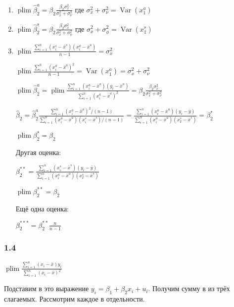 \documentclass[10pt, a4paper]{extarticle}
\def \hb{\hat{\beta}}
\DeclareMathOperator{\plim}{plim}
\DeclareMathOperator{\Var}{Var}
\begin{document}
\begin{enumerate}
	\item $\plim \hb_2^a = \beta_2 \frac{\beta_2\sigma_x^2}{\sigma_x^2 + \sigma_\nu^2}$ где $\sigma_x^2 + \sigma_\nu^2 = \Var(x_1^a)$
	
	\item $\plim \hb_2^s = \beta_2 \frac{\beta_2\sigma_x^2}{\sigma_x^2 + \sigma_\phi^2}$ где $\sigma_x^2 + \sigma_\phi^2 = \Var(x_1^s)$
	
	\item $\plim \frac{\sum_{i = 1}^n(x_i^s - \bar{x}^s)(x_i^a - \bar{x}^a)}{n - 1} = \sigma_x^2$ 
	
	$\plim \frac{\sum_{i = 1}^n(x_i^a - \bar{x}^a)^2}{n - 1}  = \Var(x_1^a) = \sigma_x^2 + \sigma_\nu^2$
	
	$\plim \hb_2^a = \plim \frac{\sum_{i = 1}^n(x_i^a - \bar{x}^a)(y_i - \bar{x}^a)}{\sum_{i = 1}^n(x_i^a - \bar{x}^a)^2} = \beta_2 \frac{\beta_2\sigma_x^2}{\sigma_x^2 + \sigma_\nu^2}$
	
	$\hb_2 = \hb_2^a \frac{\sum_{i = 1}^n(x_i^a - \bar{x}^a)^2 / (n - 1)}{\sum_{i = 1}^n(x_i^a - \bar{x}^a)(x_i^s - \bar{x}^s) / (n - 1)} = \frac{\sum_{i = 1}^n(x_i^a - \bar{x}^a)(y_i - \bar{y})}{\sum_{i = 1}^n(x_i^a - \bar{x}^a)(x_I^s - \bar{x}^s)} = \beta_2^*$
	
	$\plim \beta_2^* = \beta_2$
	
	Другая оценка:
	
	$\beta_2^{**} = \frac{\sum_{i = 1}^n(x_i^s - \bar{x}^s)(y_i - \bar{y})}{\sum_{i = 1}^n(x_i^a - \bar{x}^a)(x_I^s - \bar{x}^s)}$
	
	$\plim \beta_2^{**} = \beta_2$
	
	Ещё одна оценка:
	
	$\beta_2^{***} = \beta_2^{**} \frac{n}{n-1}$
	
\end{enumerate}

\subsubsection*{1.4}

$\plim \frac{\sum_{i = 1}^n(x_i - \bar{x})y_i}{\sum_{i = 1}^n(x_i - \bar{x})^2}$

Подставим в это выражение $y_i = \beta_1 + \beta_2x_i + u_i$. Получим сумму в из трёх слагаемых. Рассмотрим каждое в отдельности.
\end{document}
